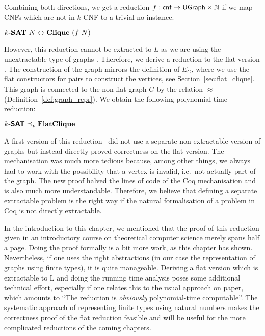 Combining both directions, we get a reduction $f : \textsf{cnf} \rightarrow \textsf{UGraph} \times \mathbb{N}$ if we map CNFs which are not in $k$-CNF to a trivial no-instance.
\begin{theorem}
  $\text{$k$-\textbf{SAT}{}}~N \leftrightarrow \textbf{Clique}{}~(f~N)$
\end{theorem}

However, this reduction cannot be extracted to $L$ as we are using the unextractable type of graphs \UGraph. 
Therefore, we derive a reduction to the flat version \FlatClique{}. The construction of the graph mirrors the definition of $E_G$, where we use the flat constructors for pairs to construct the vertices, see Section~\ref{sec:flat_clique}. 
This graph is connected to the non-flat graph $G$ by the relation $\approx$ (Definition~\ref{def:graph_repr}). 
We obtain the following polynomial-time reduction:
\begin{theorem}
  $\textsf{$k$-\textbf{SAT}{}} \preceq_p{} \textbf{FlatClique}{}$
\end{theorem}

\begin{remark}
  A first version of this reduction~\cite{memo_clique} did not use a separate non-extractable version of graphs but instead directly proved correctness on the flat version. 
  The mechanisation was much more tedious because, among other things, we always had to work with the possibility that a vertex is invalid, i.e.\ not actually part of the graph. 
  The new proof halved the lines of code of the Coq mechanisation and is also much more understandable. Therefore, we believe that defining a separate extractable problem is the right way if the natural formalisation of a problem in Coq is not directly extractable.
\end{remark}

In the introduction to this chapter, we mentioned that the proof of this reduction given in an introductory course on theoretical computer science merely spans half a page. Doing the proof formally is a bit more work, as this chapter has shown. Nevertheless, if one uses the right abstractions (in our case the representation of graphs using finite types), it is quite manageable. 
Deriving a flat version which is extractable to L and doing the running time analysis poses some additional technical effort, especially if one relates this to the usual approach on paper, which amounts to ``The reduction is \textit{obviously} polynomial-time computable''. 
The systematic approach of representing finite types using natural numbers makes the correctness proof of the flat reduction feasible and will be useful for the more complicated reductions of the coming chapters.
